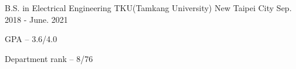 

\begin{cventries}

  \cventry
    {B.S. in Electrical Engineering} %
    {TKU(Tamkang University)} %
    {New Taipei City} %
    {Sep. 2018 - June. 2021} %
    {
      \begin{cvitems}
        \item {GPA -- 3.6/4.0}
        \item {Department rank -- 8/76}
      \end{cvitems}
    }

\end{cventries}
